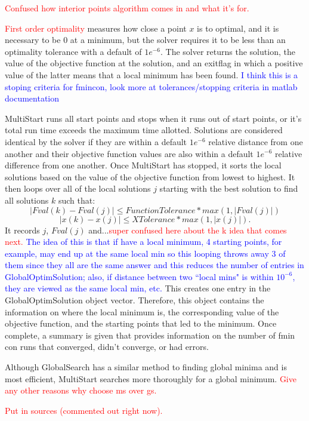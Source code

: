 \documentclass[12pt]{article}
\begin{document}
\textcolor{red}{Confused how interior points algorithm comes in and what it's for.}


\textcolor{red}{First order optimality} measures how close a point $x$ is to optimal, and it is necessary to be 0 at a minimum, but the solver requires it to be less than an optimality tolerance with a default of $1e^{-6}$. %
The solver returns the solution, the value of the objective function at the solution, and an exitflag in which a positive value of the latter means that a local minimum has been found. \textcolor{blue}{I think this is a stoping criteria for fmincon, look more at tolerances/stopping criteria in matlab documentation} %

MultiStart runs all start points and stops when it runs out of start points, or it's total run time exceeds the maximum time allotted. Solutions are considered identical by the solver if they are within a default $1e^{-6}$ relative distance from one another and their objective function values are also within a default $1e^{-6}$ relative difference from one another. %
Once MultiStart has stopped, it sorts the local solutions based on the value of the objective function from lowest to highest. It then loops over all of the local solutions $j$ starting with the best solution to find all solutions $k$ such that: \\ 
$$|Fval(k)-Fval(j)| \leq FunctionTolerance*max(1, |Fval(j)|)$$
$$|x(k)-x(j)| \leq XTolerance*max(1,|x(j)|).$$
It records $j$, $Fval(j)$ and...\textcolor{red}{super confused here about the k idea that comes next.} \textcolor{blue}{The idea of this is that if have a local minimum, 4 starting points, for example, may end up at the same local min so this looping throws away 3 of them since they all are the same answer and this reduces the number of entries in GlobalOptimSolution; also, if distance between two ``local mins" is within $10^{-6}$, they are viewed as the same local min, etc.}
This creates one entry in the GlobalOptimSolution object vector. %
Therefore, this object contains the information on where the local minimum is, the corresponding value of the objective function, and the starting points that led to the minimum. 
Once complete, a summary is given that provides information on the number of fmin con runs that converged, didn't converge, or had errors. %






Although GlobalSearch has a similar method to finding global minima and is most efficient, MultiStart searches more thoroughly for a global minimum. \textcolor{red}{Give any other reasons why choose ms over gs.} %

\textcolor{red}{Put in sources (commented out right now).}
\end{document}
